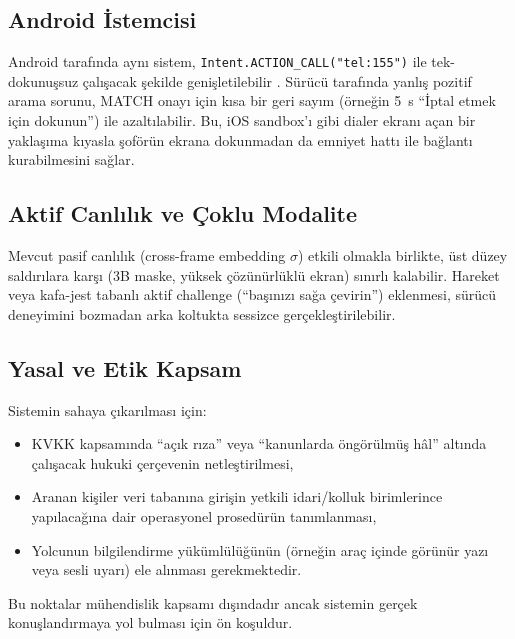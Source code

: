 \subsection{Android İstemcisi}
\label{sec:android-gelecek}

Android tarafında aynı sistem, \texttt{Intent.ACTION\_CALL("tel:155")}
ile tek-dokunuşsuz çalışacak şekilde genişletilebilir
\cite{android2024telephony}. Sürücü tarafında yanlış pozitif arama
sorunu, MATCH onayı için kısa bir geri sayım (örneğin 5~s
``İptal etmek için dokunun'') ile azaltılabilir. Bu, iOS sandbox'ı
gibi dialer ekranı açan bir yaklaşıma kıyasla şoförün ekrana
dokunmadan da emniyet hattı ile bağlantı kurabilmesini sağlar.

\subsection{Aktif Canlılık ve Çoklu Modalite}

Mevcut pasif canlılık (cross-frame embedding $\sigma$) etkili olmakla
birlikte, üst düzey saldırılara karşı (3B maske, yüksek çözünürlüklü
ekran) sınırlı kalabilir. Hareket veya kafa-jest tabanlı aktif challenge
(``başınızı sağa çevirin'') eklenmesi, sürücü deneyimini bozmadan
arka koltukta sessizce gerçekleştirilebilir.

\subsection{Yasal ve Etik Kapsam}

Sistemin sahaya çıkarılması için:

\begin{itemize}
    \item KVKK kapsamında ``açık rıza'' veya ``kanunlarda öngörülmüş
          hâl'' altında çalışacak hukuki çerçevenin netleştirilmesi,
    \item Aranan kişiler veri tabanına girişin yetkili idari/kolluk
          birimlerince yapılacağına dair operasyonel prosedürün
          tanımlanması,
    \item Yolcunun bilgilendirme yükümlülüğünün (örneğin araç içinde
          görünür yazı veya sesli uyarı) ele alınması gerekmektedir.
\end{itemize}

Bu noktalar mühendislik kapsamı dışındadır ancak sistemin gerçek
konuşlandırmaya yol bulması için ön koşuldur.
